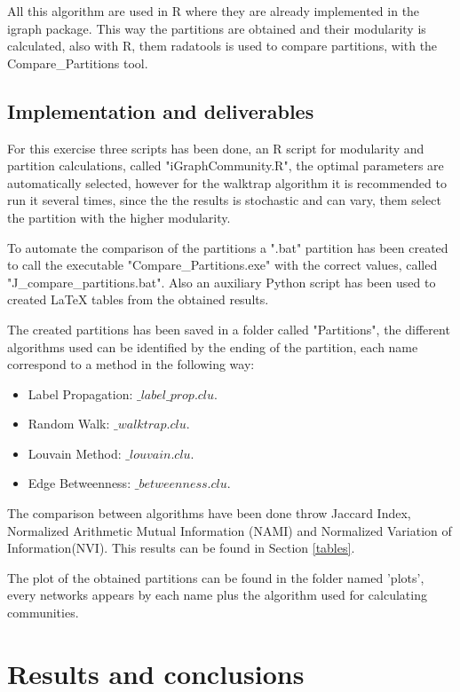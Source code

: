 \documentclass[12pt,a4paper,oneside]{article}
\numberwithin{equation}{section}
\numberwithin{equation}{section}
\theoremstyle{definition}
\begin{document}
All this algorithm are used in R where they are already implemented in the igraph package. This way the partitions are obtained and their modularity is calculated, also with R, them radatools is used to compare partitions, with the Compare\_Partitions tool.

\subsection{Implementation and deliverables}

For this exercise three scripts has been done, an R script for modularity and partition calculations, called "iGraphCommunity.R", the optimal parameters are automatically selected, however for the walktrap algorithm it is recommended to run it several times, since the the results is stochastic and can vary, them select the partition with the higher modularity.

To automate the comparison of the partitions a ".bat" partition has been created to call the executable "Compare\_Partitions.exe" with the correct values, called "J\_compare\_partitions.bat". Also an auxiliary Python script has been used to created LaTeX tables from the obtained results.

The created partitions has been saved in a folder called "Partitions", the different algorithms used can be identified by the ending of the partition, each name correspond to a method in the following way:
\begin{itemize}
	\item Label Propagation: $ \_label\_prop.clu$.
	\item Random Walk: $\_walktrap.clu$.
	\item Louvain Method: $\_louvain.clu$.
	\item Edge Betweenness: $\_betweenness.clu$.
\end{itemize}

The comparison between algorithms have been done throw  Jaccard Index, Normalized Arithmetic Mutual Information (NAMI) and Normalized Variation of Information(NVI). This results can be found in Section \ref{tables}.

The plot of the obtained partitions can be found in the folder named 'plots', every networks appears by each name plus the algorithm used for calculating communities.

\section{Results and conclusions}
\end{document}
